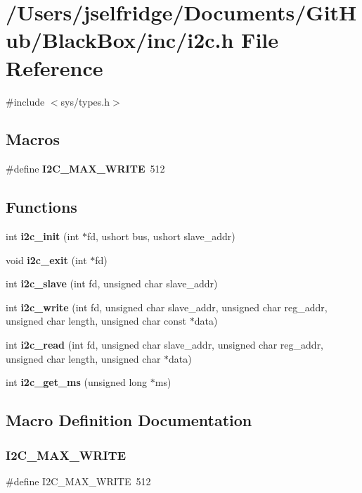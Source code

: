 \section{/\+Users/jselfridge/\+Documents/\+Git\+Hub/\+Black\+Box/inc/i2c.h File Reference}
\label{i2c_8h}
{\ttfamily \#include $<$sys/types.\+h$>$}\newline
\subsection*{Macros}
\begin{DoxyCompactItemize}
\item 
\#define \textbf{ I2\+C\+\_\+\+M\+A\+X\+\_\+\+W\+R\+I\+TE}~512
\end{DoxyCompactItemize}
\subsection*{Functions}
\begin{DoxyCompactItemize}
\item 
int \textbf{ i2c\+\_\+init} (int $\ast$fd, ushort bus, ushort slave\+\_\+addr)
\item 
void \textbf{ i2c\+\_\+exit} (int $\ast$fd)
\item 
int \textbf{ i2c\+\_\+slave} (int fd, unsigned char slave\+\_\+addr)
\item 
int \textbf{ i2c\+\_\+write} (int fd, unsigned char slave\+\_\+addr, unsigned char reg\+\_\+addr, unsigned char length, unsigned char const $\ast$data)
\item 
int \textbf{ i2c\+\_\+read} (int fd, unsigned char slave\+\_\+addr, unsigned char reg\+\_\+addr, unsigned char length, unsigned char $\ast$data)
\item 
int \textbf{ i2c\+\_\+get\+\_\+ms} (unsigned long $\ast$ms)
\end{DoxyCompactItemize}


\subsection{Macro Definition Documentation}
\mbox{\label{i2c_8h_a4e5501329197088af7664b93d81b3a1a}} 
\subsubsection{I2\+C\+\_\+\+M\+A\+X\+\_\+\+W\+R\+I\+TE}
{\footnotesize\ttfamily \#define I2\+C\+\_\+\+M\+A\+X\+\_\+\+W\+R\+I\+TE~512}



